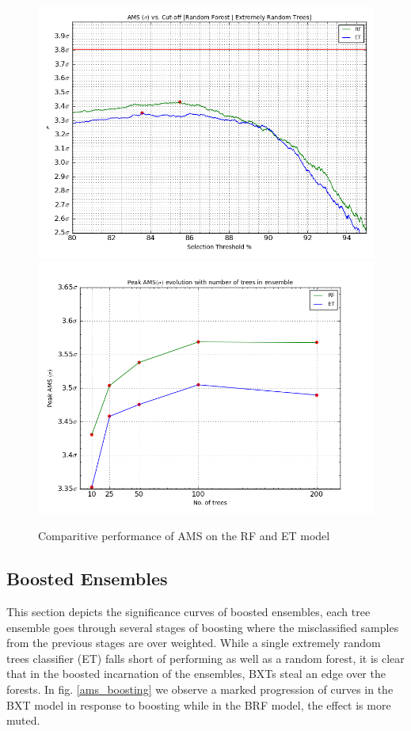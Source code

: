 \begin{figure}
\includegraphics[width=\textwidth]{images/AMS_Curve_ET_RF.png}
\includegraphics[width=\textwidth]{images/Peak_AMS_Evolution.png}
\caption{Comparitive performance of AMS on the RF and ET model}
\label{ams_et_rf}
\end{figure}

\subsection{Boosted Ensembles}

This section depicts the significance curves of boosted ensembles, each tree ensemble goes through several stages of boosting where the misclassified samples from the previous stages are over weighted. While a single extremely random trees classifier (ET) falls short of performing as well as a random forest, it is clear that in the boosted incarnation of the ensembles, BXTs steal an edge over the forests. In fig. \ref{ams_boosting} we observe a marked progression of curves in the BXT model in response to boosting while in the BRF model, the effect is more muted. 

